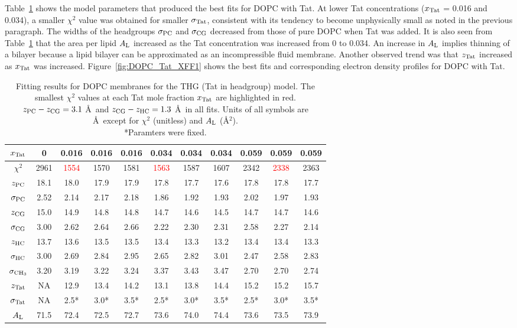 Table~\ref{tab:DOPC_fit_results} shows the model parameters that produced
the best fits for DOPC with Tat.
At lower Tat concentrations ($x_\textrm{Tat}$ = 0.016 and 0.034), 
a smaller $\chi^2$ value was obtained for smaller $\sigma_\textrm{Tat}$,
consistent with its tendency to become unphysically small as noted 
in the previous paragraph. The widths of the headgroups $\sigma_\textrm{PC}$ and
$\sigma_\textrm{CG}$ decreased from those of pure DOPC when Tat was added.  
It is also seen from Table~\ref{tab:DOPC_fit_results} 
that the area per lipid $A_\textrm{L}$ increased as the Tat concentration was
increased from 0 to 0.034. An increase in $A_\textrm{L}$ implies thinning of a bilayer because
a lipid bilayer can be approximated as an incompressible fluid membrane. 
Another observed trend was that $z_\textrm{Tat}$ increased as $x_\textrm{Tat}$ was increased.
Figure~\ref{fig:DOPC_Tat_XFF1} shows the best fits and corresponding 
electron density profiles for DOPC with Tat.

\begin{table}[htbp]
  \centering
  \begin{tabular}{c|c|ccc|ccc|ccc}
    \hline
    $x_\textrm{Tat}$ & 0 & 0.016 & 0.016 & 0.016 & 0.034 & 0.034 & 0.034 & 0.059 & 0.059 & 0.059 \\
    \hline
    $\chi^2$ & 2961 & \textcolor{red}{1554} & 1570 & 1581 & \textcolor{red}{1563} & 1587 & 1607 & 2342 & \textcolor{red}{2338} & 2363 \\ 
    $z_\textrm{PC}$ & 18.1 & 18.0 & 17.9 & 17.9 & 17.8 & 17.7 & 17.6 & 17.8 & 17.8 & 17.7 \\
    $\sigma_\textrm{PC}$ & 2.52 & 2.14 & 2.17 & 2.18 & 1.86 & 1.92 & 1.93 & 2.02 & 1.97 & 1.93 \\
    $z_\textrm{CG}$ & 15.0 & 14.9 & 14.8 & 14.8 & 14.7 & 14.6 & 14.5 & 14.7 & 14.7 & 14.6 \\
    $\sigma_\textrm{CG}$ & 3.00 & 2.62 & 2.64 & 2.66 & 2.22 & 2.30 & 2.31 & 2.58 & 2.27 & 2.14 \\
    $z_\textrm{HC}$ & 13.7 & 13.6 & 13.5 & 13.5 & 13.4 & 13.3 & 13.2 & 13.4 & 13.4 & 13.3 \\ 
    $\sigma_\textrm{HC}$ & 3.00 & 2.69 & 2.84 & 2.95 & 2.65 & 2.82 & 3.01 & 2.47 & 2.58 & 2.83 \\
    $\sigma_{\textrm{CH}_3}$ & 3.20 & 3.19 & 3.22 & 3.24 & 3.37 & 3.43 & 3.47 & 2.70 & 2.70 & 2.74 \\
    $z_\textrm{Tat}$ & NA & 12.9 & 13.4 & 14.2 & 13.1 & 13.8 & 14.4 & 15.2 & 15.2 & 15.7 \\
    $\sigma_\textrm{Tat}$ & NA & 2.5* & 3.0* & 3.5* & 2.5* & 3.0* & 3.5* & 2.5* & 3.0* & 3.5* \\ 
    $A_\textrm{L}$ & 71.5 & 72.4 & 72.5 & 72.7 & 73.6 & 74.0 & 74.4 & 73.6 & 73.5 & 73.9 \\
    \hline
  \end{tabular}
  \caption[Fitting results for DOPC membranes for the THG (Tat in headgroup) model]
  {Fitting results for DOPC membranes for the THG (Tat in headgroup) model. 
  The smallest $\chi^2$ values at each Tat mole fraction $x_\textrm{Tat}$ are highlighted in red.  
  $z_\textrm{PC}-z_\textrm{CG} = 3.1$ \AA\
  and $z_\textrm{CG}-z_\textrm{HC} = 1.3$ \AA\ in all fits.
  Units of all symbols are \AA\ except for $\chi^2$ (unitless) and $A_\textrm{L}$ (\AA$^2$).  
  \\
  *Paramters were fixed.}
  \label{tab:DOPC_fit_results}
\end{table}

